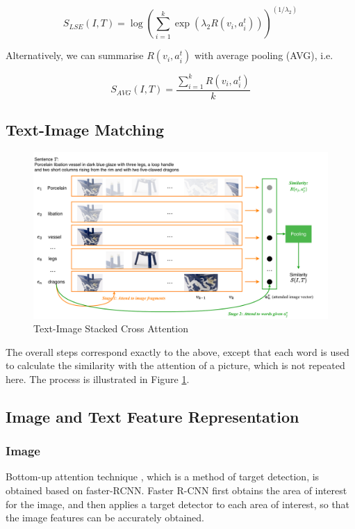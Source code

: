 $$
S_{L S E}(I, T)=\log \left(\sum_{i=1}^{k} \exp \left(\lambda_{2} R\left(v_{i}, a_{i}^{t}\right)\right)\right)^{\left(1 / \lambda_{2}\right)}
$$

Alternatively, we can
summarise $R\left(v_{i}, a_{i}^{t}\right)$ with average pooling (AVG), i.e.

$$
S_{A V G}(I, T)=\frac{\sum_{i=1}^{k} R\left(v_{i}, a_{i}^{t}\right)}{k}
$$

\subsection{Text-Image Matching}

\begin{figure}[h!]
\centering
\includegraphics[width=1\textwidth]{scan2.pdf}
\caption{Text-Image Stacked Cross Attention}
\label{fig:scan2}
\end{figure}

The overall steps correspond exactly to the above, except that each word is used to calculate the similarity with the attention of a picture, which is not repeated here. The process is illustrated in Figure \ref{fig:scan2}.

\subsection{Image and Text Feature Representation}

\subsubsection{Image}Bottom-up attention technique \cite{bottomup}, which is a method of target detection, is obtained based on faster-RCNN. Faster R-CNN first obtains the area of interest for the image, and then applies a target detector to each area of interest, so that the image features can be accurately obtained.

